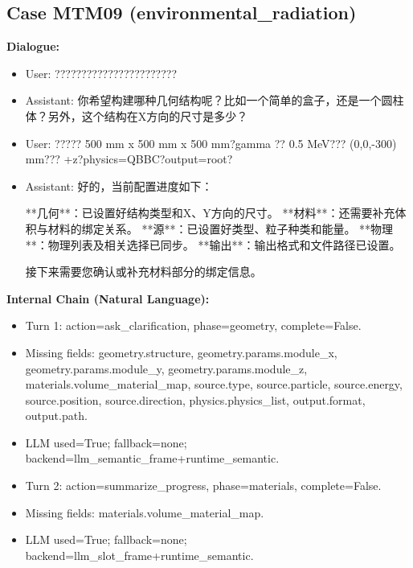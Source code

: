 \documentclass[11pt]{ctexart}
\begin{document}
\subsection{Case MTM09 (environmental\_radiation)}
\textbf{Dialogue:}
\begin{itemize}
\item User: ???????????????????????
\item Assistant: 你希望构建哪种几何结构呢？比如一个简单的盒子，还是一个圆柱体？另外，这个结构在X方向的尺寸是多少？
\item User: ????? 500 mm x 500 mm x 500 mm?gamma ?? 0.5 MeV??? (0,0,-300) mm??? +z?physics=QBBC?output=root?
\item Assistant: 好的，当前配置进度如下：

**几何**：已设置好结构类型和X、Y方向的尺寸。
**材料**：还需要补充体积与材料的绑定关系。
**源**：已设置好类型、粒子种类和能量。
**物理**：物理列表及相关选择已同步。
**输出**：输出格式和文件路径已设置。

接下来需要您确认或补充材料部分的绑定信息。
\end{itemize}
\textbf{Internal Chain (Natural Language):}
\begin{itemize}
\item Turn 1: action=ask\_clarification, phase=geometry, complete=False.
\item Missing fields: geometry.structure, geometry.params.module\_x, geometry.params.module\_y, geometry.params.module\_z, materials.volume\_material\_map, source.type, source.particle, source.energy, source.position, source.direction, physics.physics\_list, output.format, output.path.
\item LLM used=True; fallback=none; backend=llm\_semantic\_frame+runtime\_semantic.
\item Turn 2: action=summarize\_progress, phase=materials, complete=False.
\item Missing fields: materials.volume\_material\_map.
\item LLM used=True; fallback=none; backend=llm\_slot\_frame+runtime\_semantic.
\end{itemize}
\end{document}
